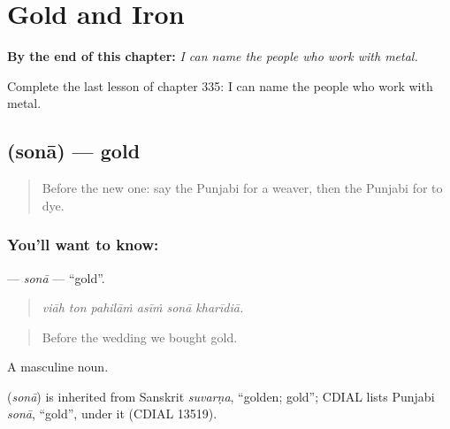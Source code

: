 
\chapter{Gold and Iron}
\label{ch:pa-a2-gold-and-iron}

\begin{chapteropening}
\textbf{By the end of this chapter:} \emph{I can name the people who work with metal.}

Complete the last lesson of chapter 335: I can name the people who work with metal.
\end{chapteropening}

\section[\texorpdfstring{\pa{ਸੋਨਾ} (sonā)}{ਸੋਨਾ (sonā)}]{ (sonā) — gold}

\label{lesson:PA-C335-sona}



\begin{quote}
Before the new one: say the Punjabi for a weaver, then the Punjabi for to dye.
\end{quote}

\subsection*{You'll want to know: }
\textbf{} — \emph{sonā} — \textquotedblleft{}gold\textquotedblright{}.

\begin{quote}
     
\end{quote}

\begin{quote}
\emph{viāh ton pahilāṁ asīṁ sonā kharīdiā.}
\end{quote}

\begin{quote}
Before the wedding we bought gold.
\end{quote}

A masculine noun.

\begin{cousinweb}
\textbf{} (\emph{sonā}) is inherited from Sanskrit \emph{suvarṇa}, \textquotedblleft{}golden; gold\textquotedblright{}; CDIAL lists Punjabi \emph{sonā}, \textquotedblleft{}gold\textquotedblright{}, under it (CDIAL 13519).
\end{cousinweb}

